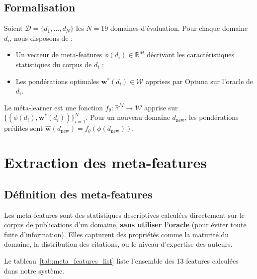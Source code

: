 \subsection{Formalisation}

Soient $\mathcal{D} = \{d_1, \ldots, d_N\}$ les $N = 19$ domaines d'évaluation.
Pour chaque domaine $d_i$, nous disposons de :
\begin{itemize}
  \item Un vecteur de meta-features $\phi(d_i) \in \mathbb{R}^M$ décrivant
    les caractéristiques statistiques du corpus de $d_i$ ;
  \item Les pondérations optimales $\mathbf{w}^*(d_i) \in \mathcal{W}$
    apprises par Optuna sur l'oracle de $d_i$.
\end{itemize}

Le méta-learner est une fonction $f_\theta : \mathbb{R}^M \to \mathcal{W}$
apprise sur $\{(\phi(d_i), \mathbf{w}^*(d_i))\}_{i=1}^N$.
Pour un nouveau domaine $d_{\text{new}}$, les pondérations prédites sont
$\hat{\mathbf{w}}(d_{\text{new}}) = f_\theta(\phi(d_{\text{new}}))$.

\section{Extraction des meta-features}
\label{sec:meta_features}

\subsection{Définition des meta-features}

Les meta-features sont des statistiques descriptives calculées directement
sur le corpus de publications d'un domaine, \textbf{sans utiliser l'oracle}
(pour éviter toute fuite d'information). Elles capturent des propriétés
comme la maturité du domaine, la distribution des citations, ou le niveau
d'expertise des auteurs.

Le tableau~\ref{tab:meta_features_list} liste l'ensemble des 13 features
calculées dans notre système.

